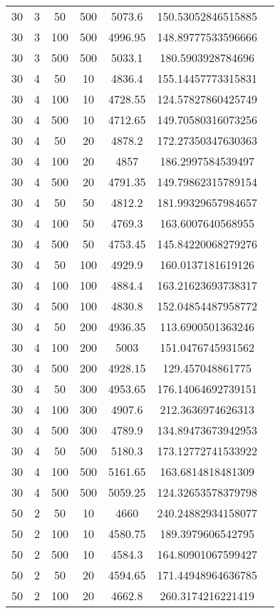{\begin{longtabu}{S
S
S
S
S
S[round-mode=places, round-precision=0]
S[round-mode=places, round-precision=0]}
30 & 3 & 50 & 500 & 5073.6 & 150.53052846515885 \\
30 & 3 & 100 & 500 & 4996.95 & 148.89777533596666 \\
30 & 3 & 500 & 500 & 5033.1 & 180.5903928784696 \\
30 & 4 & 50 & 10 & 4836.4 & 155.14457773315831 \\
30 & 4 & 100 & 10 & 4728.55 & 124.57827860425749 \\
30 & 4 & 500 & 10 & 4712.65 & 149.70580316073256 \\
30 & 4 & 50 & 20 & 4878.2 & 172.27350347630363 \\
30 & 4 & 100 & 20 & 4857 & 186.2997584539497 \\
30 & 4 & 500 & 20 & 4791.35 & 149.79862315789154 \\
30 & 4 & 50 & 50 & 4812.2 & 181.99329657984657 \\
30 & 4 & 100 & 50 & 4769.3 & 163.6007640568955 \\
30 & 4 & 500 & 50 & 4753.45 & 145.84220068279276 \\
30 & 4 & 50 & 100 & 4929.9 & 160.0137181619126 \\
30 & 4 & 100 & 100 & 4884.4 & 163.21623693738317 \\
30 & 4 & 500 & 100 & 4830.8 & 152.04854487958772 \\
30 & 4 & 50 & 200 & 4936.35 & 113.6900501363246 \\
30 & 4 & 100 & 200 & 5003 & 151.0476745931562 \\
30 & 4 & 500 & 200 & 4928.15 & 129.457048861775 \\
30 & 4 & 50 & 300 & 4953.65 & 176.14064692739151 \\
30 & 4 & 100 & 300 & 4907.6 & 212.3636974626313 \\
30 & 4 & 500 & 300 & 4789.9 & 134.89473673942953 \\
30 & 4 & 50 & 500 & 5180.3 & 173.12772741533922 \\
30 & 4 & 100 & 500 & 5161.65 & 163.6814818481309 \\
30 & 4 & 500 & 500 & 5059.25 & 124.32653578379798 \\
50 & 2 & 50 & 10 & 4660 & 240.24882934158077 \\
50 & 2 & 100 & 10 & 4580.75 & 189.3979606542795 \\
50 & 2 & 500 & 10 & 4584.3 & 164.80901067599427 \\
50 & 2 & 50 & 20 & 4594.65 & 171.44948964636785 \\
50 & 2 & 100 & 20 & 4662.8 & 260.3174216221419 \\

\end{longtabu}}
